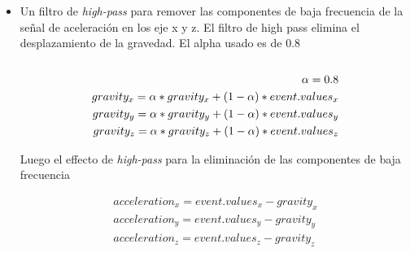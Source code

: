 \begin{itemize}
	\item  Un filtro de \emph{high-pass} para remover las componentes de baja frecuencia de la señal de aceleración en los eje x y z.  El filtro de high pass elimina el desplazamiento de la gravedad.
	      El alpha usado es de 0.8 \\\\
	      \begin{align*}
		      \alpha = 0.8                                                           \\
		      gravity_{x} = \alpha * gravity_x + (1-\alpha) *event.values_{x} \notag \\
		      gravity_{y} = \alpha * gravity_y + (1-\alpha) *event.values_{y} \notag \\
		      gravity_{z} = \alpha * gravity_z + (1-\alpha) *event.values_{z} \notag \\
	      \end{align*}

	      Luego el effecto de \emph{high-pass} para la eliminación de las componentes de baja frecuencia

	      \begin{align*}
		      acceleration_{x} =  event.values_{x} - gravity_{x} \\
		      acceleration_{y} = event.values_{y} - gravity_{y}  \\
		      acceleration_{z} = event.values_{z} - gravity_{z}
	      \end{align*}


\end{itemize}
